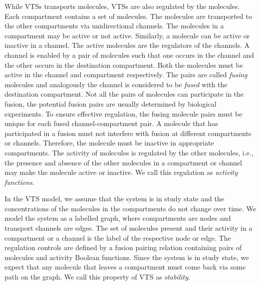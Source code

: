 While VTSs transports molecules, VTSs are also
regulated by the molecules.
%
Each compartment contains a set of molecules.
%
The molecules are transported to the other compartments via
unidirectional channels.  
%
The molecules in a compartment may be active or not active.
%
Similarly, a molecule can be active or inactive in a channel. 
%
The active molecules are the regulators of the channels.
%
A channel is enabled by a pair of molecules
such that one occurs in the channel and the other
occurs in the destination compartment.
%
Both the molecules must be active in the channel
and compartment respectively.
%
The pairs are called {\em fusing} molecules and analogously
the channel is considered to be {\em fused} with the
destination compartment.
%
Not all the pairs of molecules can participate in the fusion, the
potential fusion pairs are usually determined by biological experiments.
%
To ensure effective regulation, the fusing molecule pairs must be
unique for each fused channel-compartment pair.
%
A molecule that has participated in a fusion must not interfere
with fusion at different compartments or channels.
%
Therefore, the molecule must be inactive in appropriate compartments.
%
The activity of molecules is regulated by the other molecules, i.e.,
the presence and absence of the other molecules in a compartment or
channel may make the molecule active or inactive.
%
We call this regulation as {\em activity functions}.

%
In the VTS model, we assume that the system is in study state and
the concentrations of the molecules in the compartments do not change over time.
%
We model the system as a labelled graph, where compartments are nodes and
transport channels are edges.
%
The set of molecules present and their activity in a compartment or
a channel is the label of the respective node or edge.
%
The regulation controls are defined by a fusion pairing relation
containing pairs of molecules and activity
Boolean functions.
%
Since the system is in study state, we expect that any molecule that
leaves a compartment must come back via some path on the graph.
%
We call this property of VTS as {\em stability}.

